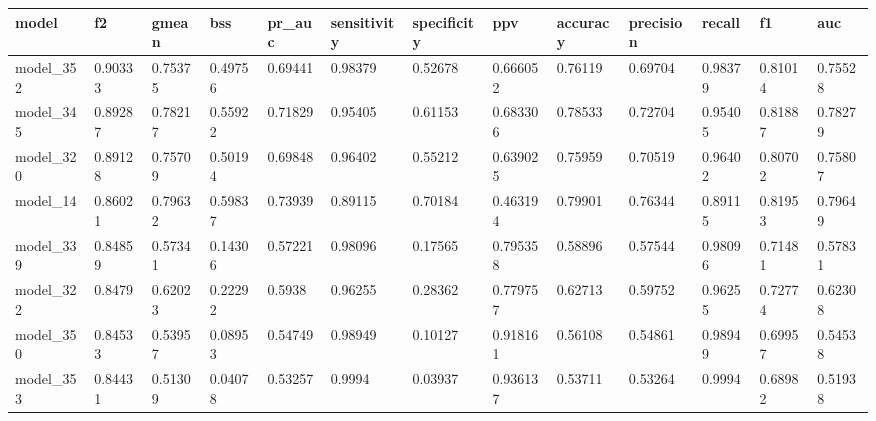 \begin{tabular}{|l|l|l|l|l|l|l|l|l|l|l|l|l|}
\hline
\textbf{model} & \textbf{f2} & \textbf{gmean} & \textbf{bss} & \textbf{pr\_auc} & \textbf{sensitivity} & \textbf{specificity} & \textbf{ppv} & \textbf{accuracy} & \textbf{precision} & \textbf{recall} & \textbf{f1} & \textbf{auc} \\ \hline
model\_352     & 0.90333     & 0.75375        & 0.49756      & 0.69441          & 0.98379              & 0.52678              & 0.666052     & 0.76119           & 0.69704            & 0.98379         & 0.81014     & 0.75528      \\ \hline
model\_345     & 0.89287     & 0.78217        & 0.55922      & 0.71829          & 0.95405              & 0.61153              & 0.683306     & 0.78533           & 0.72704            & 0.95405         & 0.81887     & 0.78279      \\ \hline
model\_320     & 0.89128     & 0.75709        & 0.50194      & 0.69848          & 0.96402              & 0.55212              & 0.639025     & 0.75959           & 0.70519            & 0.96402         & 0.80702     & 0.75807      \\ \hline
model\_14      & 0.86021     & 0.79632        & 0.59837      & 0.73939          & 0.89115              & 0.70184              & 0.463194     & 0.79901           & 0.76344            & 0.89115         & 0.81953     & 0.79649      \\ \hline
model\_339     & 0.84859     & 0.57341        & 0.14306      & 0.57221          & 0.98096              & 0.17565              & 0.795358     & 0.58896           & 0.57544            & 0.98096         & 0.71481     & 0.57831      \\ \hline
model\_322     & 0.8479      & 0.62023        & 0.22292      & 0.5938           & 0.96255              & 0.28362              & 0.779757     & 0.62713           & 0.59752            & 0.96255         & 0.72774     & 0.62308      \\ \hline
model\_350     & 0.84533     & 0.53957        & 0.08953      & 0.54749          & 0.98949              & 0.10127              & 0.918161     & 0.56108           & 0.54861            & 0.98949         & 0.69957     & 0.54538      \\ \hline
model\_353     & 0.84431     & 0.51309        & 0.04078      & 0.53257          & 0.9994               & 0.03937              & 0.936137     & 0.53711           & 0.53264            & 0.9994          & 0.68982     & 0.51938      \\ \hline

\end{tabular}
